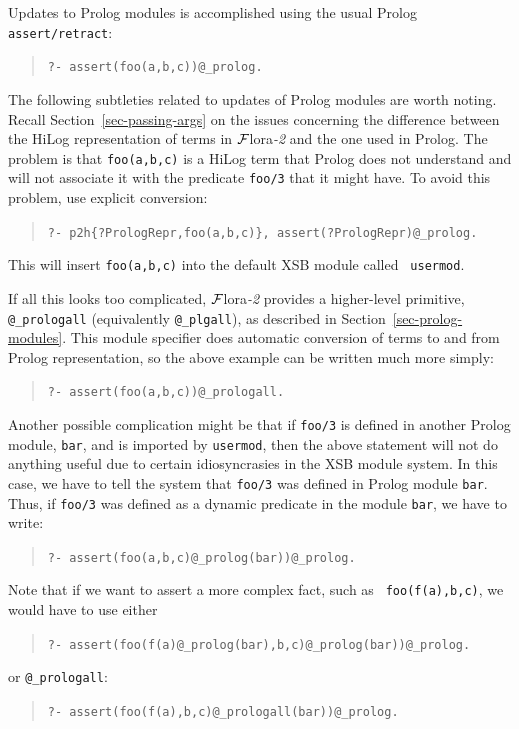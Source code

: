 \documentclass[11pt]{article}
\newcommand{\FLORA}{{\mbox{\sc ${\cal F}${lora}\rm\emph{-2}}}\xspace}
\begin{document}
Updates to Prolog modules is accomplished using the usual
Prolog {\tt assert/retract}:
\begin{quote}
 {\tt ?- assert(foo(a,b,c))@\_prolog.  }
\end{quote}
The following subtleties related to updates of Prolog modules are worth
noting. Recall Section~\ref{sec-passing-args} on the issues concerning the
difference between the HiLog representation of terms in \FLORA and the one
used in Prolog. The problem is that {\tt foo(a,b,c)} is a HiLog term that
Prolog does not understand and will not associate it with the predicate
{\tt foo/3} that it might have. To avoid this problem, use explicit conversion:
\begin{quote}
 {\tt ?- p2h\{?PrologRepr,foo(a,b,c)\}, assert(?PrologRepr)@\_prolog.  }
\end{quote}
This will insert {\tt foo(a,b,c)} into the default XSB module called {\tt
  usermod}.

If all this looks too complicated, \FLORA provides a higher-level
primitive, {\tt @\_prologall} (equivalently {\tt @\_plgall}), as described in
Section~\ref{sec-prolog-modules}. This module specifier does automatic
conversion of terms to and from Prolog representation, so the above example
can be written much more simply:
\begin{quote}
 {\tt ?- assert(foo(a,b,c))@\_prologall.  }  
\end{quote}

Another possible complication might be that
if {\tt foo/3} is defined in another Prolog module, {\tt bar}, and
is imported by {\tt usermod}, then the above statement will not do anything
useful due to certain idiosyncrasies in the XSB module system. In this
case, we have to tell the system that {\tt foo/3} was defined in Prolog
module {\tt bar}.  Thus, if
{\tt foo/3} was defined as a dynamic predicate in the module
  {\tt bar}, we have to write:
\begin{quote}
 {\tt ?- assert(foo(a,b,c)@\_prolog(bar))@\_prolog.  }  
\end{quote}
Note that if we want to assert a more complex fact, such as {\tt
  foo(f(a),b,c)}, we would have to use either
\begin{quote}
 {\tt ?- assert(foo(f(a)@\_prolog(bar),b,c)@\_prolog(bar))@\_prolog.}  
\end{quote}
or {\tt @\_prologall}:
\begin{quote}
 {\tt ?- assert(foo(f(a),b,c)@\_prologall(bar))@\_prolog.}  
\end{quote}
\end{document}
